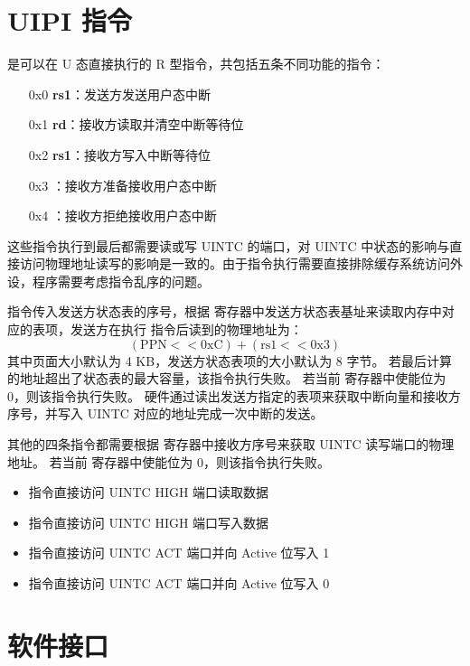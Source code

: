 \section{UIPI 指令}

\Iuipi 是可以在 U 态直接执行的 R 型指令，共包括五条不同功能的指令：

\begin{itemize}
    \item[0x0] \textbf{\Iuipisend rs1}：发送方发送用户态中断
    \item[0x1] \textbf{\Iuipiread rd}：接收方读取并清空中断等待位
    \item[0x2] \textbf{\Iuipiwrite rs1}：接收方写入中断等待位
    \item[0x3] \textbf{\Iuipiact}：接收方准备接收用户态中断
    \item[0x4] \textbf{\Iuipideact}：接收方拒绝接收用户态中断
\end{itemize}

这些指令执行到最后都需要读或写 UINTC 的端口，对 UINTC 中状态的影响与直接访问物理地址读写的影响是一致的。由于指令执行需要直接排除缓存系统访问外设，程序需要考虑指令乱序的问题。

\Iuipisend 指令传入发送方状态表的序号，根据 \Rsuist 寄存器中发送方状态表基址来读取内存中对应的表项，发送方在执行 \Iuipisend 指令后读到的物理地址为：
$$
\mathrm{( PPN << 0xC ) + ( rs1 << 0x3 )}
$$
其中页面大小默认为 4 KB，发送方状态表项的大小默认为 8 字节。
若最后计算的地址超出了状态表的最大容量，该指令执行失败。
若当前 \Rsuist 寄存器中使能位为 0，则该指令执行失败。
硬件通过读出发送方指定的表项来获取中断向量和接收方序号，并写入 UINTC 对应的地址完成一次中断的发送。

其他的四条指令都需要根据 \Rsuirs 寄存器中接收方序号来获取 UINTC 读写端口的物理地址。
若当前 \Rsuirs 寄存器中使能位为 0，则该指令执行失败。

\begin{itemize}
    \item \Iuipiread 指令直接访问 UINTC HIGH 端口读取数据
    \item \Iuipiwrite 指令直接访问 UINTC HIGH 端口写入数据
    \item \Iuipiact 指令直接访问 UINTC ACT 端口并向 Active 位写入 1
    \item \Iuipideact 指令直接访问 UINTC ACT 端口并向 Active 位写入 0
\end{itemize}

\section{软件接口}

